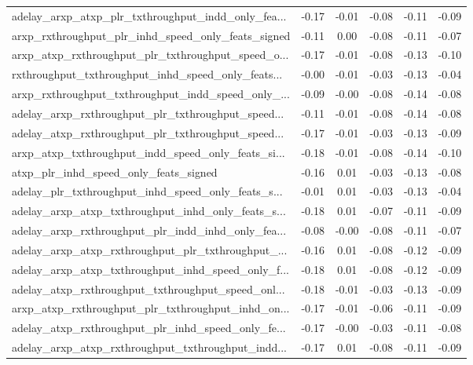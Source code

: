 \begin{tabular}{|l|*{4}{c}|r|}
adelay\_arxp\_atxp\_plr\_txthroughput\_indd\_only\_fea... & -0.17 & -0.01 &   -0.08 &      -0.11 & -0.09 \\
arxp\_rxthroughput\_plr\_inhd\_speed\_only\_feats\_signed & -0.11 &  0.00 &   -0.08 &      -0.11 & -0.07 \\
arxp\_atxp\_rxthroughput\_plr\_txthroughput\_speed\_o... & -0.17 & -0.01 &   -0.08 &      -0.13 & -0.10 \\
rxthroughput\_txthroughput\_inhd\_speed\_only\_feats... & -0.00 & -0.01 &   -0.03 &      -0.13 & -0.04 \\
arxp\_rxthroughput\_txthroughput\_indd\_speed\_only\_... & -0.09 & -0.00 &   -0.08 &      -0.14 & -0.08 \\
adelay\_arxp\_rxthroughput\_plr\_txthroughput\_speed... & -0.11 & -0.01 &   -0.08 &      -0.14 & -0.08 \\
adelay\_atxp\_rxthroughput\_plr\_txthroughput\_speed... & -0.17 & -0.01 &   -0.03 &      -0.13 & -0.09 \\
arxp\_atxp\_txthroughput\_indd\_speed\_only\_feats\_si... & -0.18 & -0.01 &   -0.08 &      -0.14 & -0.10 \\
atxp\_plr\_inhd\_speed\_only\_feats\_signed              & -0.16 &  0.01 &   -0.03 &      -0.13 & -0.08 \\
adelay\_plr\_txthroughput\_inhd\_speed\_only\_feats\_s... & -0.01 &  0.01 &   -0.03 &      -0.13 & -0.04 \\
adelay\_arxp\_atxp\_txthroughput\_inhd\_only\_feats\_s... & -0.18 &  0.01 &   -0.07 &      -0.11 & -0.09 \\
adelay\_arxp\_rxthroughput\_plr\_indd\_inhd\_only\_fea... & -0.08 & -0.00 &   -0.08 &      -0.11 & -0.07 \\
adelay\_arxp\_atxp\_rxthroughput\_plr\_txthroughput\_... & -0.16 &  0.01 &   -0.08 &      -0.12 & -0.09 \\
adelay\_arxp\_atxp\_txthroughput\_inhd\_speed\_only\_f... & -0.18 &  0.01 &   -0.08 &      -0.12 & -0.09 \\
adelay\_atxp\_rxthroughput\_txthroughput\_speed\_onl... & -0.18 & -0.01 &   -0.03 &      -0.13 & -0.09 \\
arxp\_atxp\_rxthroughput\_plr\_txthroughput\_inhd\_on... & -0.17 & -0.01 &   -0.06 &      -0.11 & -0.09 \\
adelay\_atxp\_rxthroughput\_plr\_inhd\_speed\_only\_fe... & -0.17 & -0.00 &   -0.03 &      -0.11 & -0.08 \\
adelay\_arxp\_atxp\_rxthroughput\_txthroughput\_indd... & -0.17 &  0.01 &   -0.08 &      -0.11 & -0.09 \\

\end{tabular}
